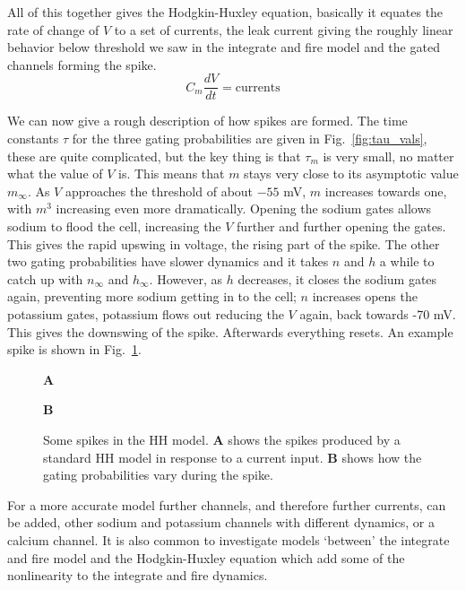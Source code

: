\documentclass[11pt,a4paper]{scrartcl}
\begin{document}
All of this together gives the Hodgkin-Huxley equation, basically it
equates the rate of change of $V$ to a set of currents, the leak
current giving the roughly linear behavior below threshold we saw in
the integrate and fire model and the gated channels forming the
spike.
\begin{equation}
C_m\frac{dV}{dt}=\mbox{currents}
\end{equation}

We can now give a rough description of how spikes are formed. The time
constants $\tau$ for the three gating probabilities are given in
Fig.~\ref{fig:tau_vals}, these are quite complicated, but the key
thing is that $\tau_m$ is very small, no matter what the value of $V$
is. This means that $m$ stays very close to its asymptotic value
$m_\infty$. As $V$ approaches the threshold of about $-55$ mV, $m$
increases towards one, with $m^3$ increasing even more
dramatically. Opening the sodium gates allows sodium to flood the
cell, increasing the $V$ further and further opening the gates. This
gives the rapid upswing in voltage, the rising part of the spike. The
other two gating probabilities have slower dynamics and it takes $n$
and $h$ a while to catch up with $n_\infty$ and $h_\infty$. However,
as $h$ decreases, it closes the sodium gates again, preventing more
sodium getting in to the cell; $n$ increases opens the potassium
gates, potassium flows out reducing the $V$ again, back towards -70
mV. This gives the downswing of the spike. Afterwards everything
resets. An example spike is shown in Fig.~\ref{fig:HH_spike}.

\begin{figure}
\textbf{A}
\begin{center}

\end{center}
\textbf{B}
\begin{center}

\end{center}
\caption{Some spikes in the HH model. \textbf{A} shows the spikes produced by a standard HH model in response to a current input. \textbf{B} shows how the gating probabilities vary during the spike.\label{fig:HH_spike}}
\end{figure}



For a more accurate model further channels, and therefore further
currents, can be added, other sodium and potassium channels with
different dynamics, or a calcium channel. It is also common to
investigate models \lq{}between\rq{} the integrate and fire model and
the Hodgkin-Huxley equation which add some of the nonlinearity to the
integrate and fire dynamics.
\end{document}
